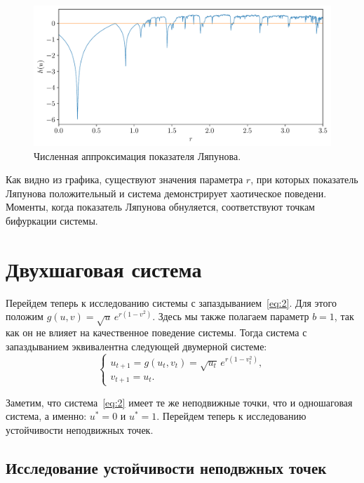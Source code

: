 \documentclass[12pt, a4paper]{article} %
\begin{document}
\begin{figure}[ht]
    \centering
    \includegraphics[width=\textwidth]{figures/lyap.pdf}
    \caption{Численная аппроксимация показателя Ляпунова.}
    \label{fig:lyap}
\end{figure}

Как видно из графика, существуют значения параметра $r$, при которых показатель Ляпунова положительный и система демонстрирует хаотическое поведени.
Моменты, когда показатель Ляпунова обнуляется, соответствуют точкам бифуркации системы.

\section{Двухшаговая система}

Перейдем теперь к исследованию системы с запаздыванием~\eqref{eq:2}.
Для этого положим $g(u, v) = \sqrt{u}\,e^{r(1-v^2)}$.
Здесь мы также полагаем параметр $b=1$, так как он не влияет на качественное поведение системы.
Тогда система с запаздыванием эквивалентна следующей двумерной системе:
 \begin{equation}\label{eq:2d}
    \begin{cases}
        u_{t+1} = g(u_t, v_t) = \sqrt{u_t}\,e^{r(1-v_t^2)},\\
        v_{t+1} = u_t.
    \end{cases} 
\end{equation} 

Заметим, что система~\eqref{eq:2} имеет те же неподвижные точки, что и одношаговая система, а именно: $u^*=0$ и  $u^*=1$.
Перейдем теперь к исследованию устойчивости неподвижных точек.

\subsection{Исследование устойчивости неподвжных точек}
\end{document}
